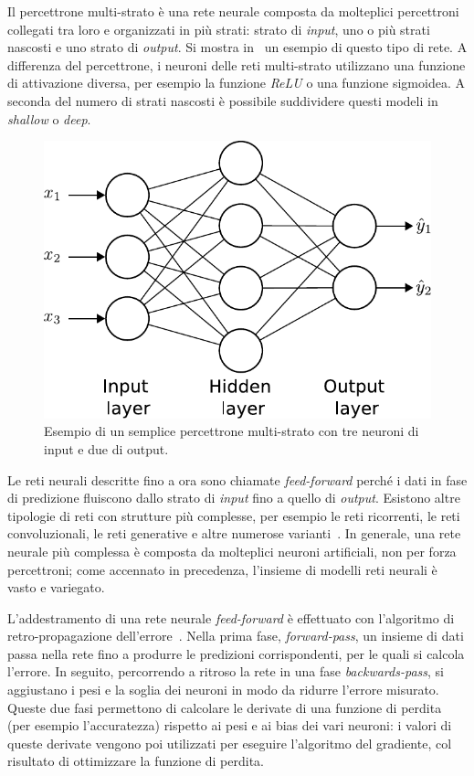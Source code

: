 Il percettrone multi-strato è una rete neurale composta da molteplici percettroni collegati tra loro e organizzati in più strati: strato di \emph{input}, uno o più strati nascosti e uno strato di \emph{output}. Si mostra in~ un esempio di questo tipo di rete. 
A differenza del percettrone, i neuroni delle reti multi-strato utilizzano una funzione di attivazione 
diversa, per esempio la funzione \emph{ReLU} o una funzione sigmoidea.
A seconda del numero di strati nascosti è possibile suddividere questi modeli in \emph{shallow} o \emph{deep}.
\begin{figure}
    \centering
    \includegraphics[width=0.5\linewidth]{img/nn.pdf}
    \caption[Esempio percettrone multi-strato.]{Esempio di un semplice percettrone multi-strato con tre neuroni di input e due di output.}
    \label{fig:NN}
\end{figure}
Le reti neurali descritte fino a ora sono chiamate \emph{feed-forward} perché i dati in fase di predizione fluiscono dallo strato di \emph{input} fino a quello di \emph{output}.
Esistono altre tipologie di reti con strutture più complesse, per esempio le reti ricorrenti, le reti convoluzionali, le reti generative e altre numerose varianti~\cite{aggarwal2018neural}.
In generale, una rete neurale più complessa è composta da molteplici neuroni artificiali, non per forza percettroni; come accennato in precedenza, l'insieme di modelli reti neurali è vasto e variegato.

L'addestramento di una rete neurale \emph{feed-forward} è effettuato con l'algoritmo di retro-propagazione dell'errore~\cite{neural_networks}.
Nella prima fase, \emph{forward-pass}, un insieme di dati passa nella rete fino a produrre le predizioni corrispondenti, per le quali si calcola l'errore. In seguito, percorrendo a ritroso la rete in una fase \emph{backwards-pass}, si aggiustano i pesi e la soglia dei neuroni in modo da ridurre l'errore misurato.
Queste due fasi permettono di calcolare le derivate di una funzione di perdita (per esempio l'accuratezza) rispetto ai pesi e ai bias dei vari neuroni: i valori di queste derivate vengono poi utilizzati per eseguire l'algoritmo del gradiente, col risultato di ottimizzare la funzione di perdita.

